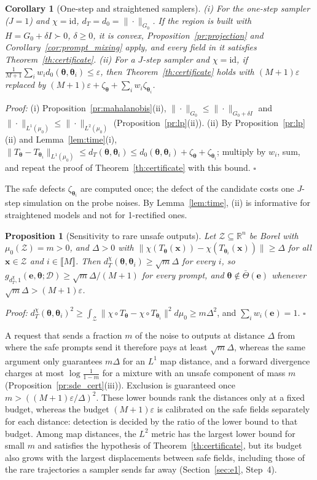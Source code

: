 \documentclass{article}
\newcommand{\RR}{\mathbb{R}}
\newcommand{\cD}{\mathcal{D}}
\newcommand{\bth}{\boldsymbol{\theta}}
\newcommand{\bx}{\mathbf{x}}
\newcommand{\be}{\mathbf{e}}
\newcommand{\Tbar}{\bar{\Theta}}
\theoremstyle{plain}
\newtheorem{proposition}[theorem]{Proposition}
\newtheorem{corollary}[theorem]{Corollary}
\theoremstyle{remark}
\begin{document}
\begin{corollary}[One-step and straightened samplers]\label{cor:one_step}
(i) For the one-step sampler ($J=1$) and $\chi=\mathrm{id}$, $d_T=d_0=\|\cdot\|_{G_0}$. If the region is built with
$H=G_0+\delta I\succ0$, $\delta\ge0$, it is convex, Proposition~\ref{pr:projection} and
Corollary~\ref{cor:prompt_mixing} apply, and every field in it satisfies Theorem~\ref{th:certificate}.
(ii) For a $J$-step sampler and $\chi=\mathrm{id}$, if $\frac{1}{M+1}\sum_iw_id_0(\bth,\bth_i)\le\varepsilon$, then
Theorem~\ref{th:certificate} holds with $(M+1)\varepsilon$ replaced by
$(M+1)\varepsilon+\zeta_{\bth}+\sum_iw_i\zeta_{\bth_i}$.
\end{corollary}
\textit{Proof:}
(i) Proposition~\ref{pr:mahalanobis}(ii), $\|\cdot\|_{G_0}\le\|\cdot\|_{G_0+\delta I}$ and
$\|\cdot\|_{L^1(\mu_0)}\le\|\cdot\|_{L^2(\mu_0)}$ (Proposition~\ref{pr:lp}(ii)). (ii) By Proposition~\ref{pr:lp}(ii) and Lemma~\ref{lem:time}(i),
$\|T_{\bth}-T_{\bth_i}\|_{L^1(\mu_0)}\le d_T(\bth,\bth_i)\le d_0(\bth,\bth_i)+\zeta_{\bth}+\zeta_{\bth_i}$; multiply by $w_i$, sum, and
repeat the proof of Theorem~\ref{th:certificate} with this bound. \hfill$\square$

The safe defects $\zeta_{\bth_i}$ are computed once; the defect of the candidate costs one $J$-step
simulation on the probe noises. By Lemma~\ref{lem:time}, (ii) is informative for straightened
models and not for 1-rectified ones.

\begin{proposition}[Sensitivity to rare unsafe outputs]\label{pr:sqrt_m}
Let $\mathcal Z\subseteq\RR^n$ be Borel with $\mu_0(\mathcal Z)=m>0$, and $\Delta>0$ with
$\|\chi(T_{\bth}(\bx))-\chi(T_{\bth_i}(\bx))\|\ge\Delta$ for all $\bx\in\mathcal Z$ and $i\in\llbracket M\rrbracket$. Then
$d^\chi_T(\bth,\bth_i)\ge\sqrt m\Delta$ for every $i$, so $g_{d^\chi_T,1}(\be,\bth;\cD)\ge\sqrt m\Delta/(M+1)$ for every
prompt, and $\bth\notin\Tbar(\be)$ whenever $\sqrt m\Delta>(M+1)\varepsilon$.
\end{proposition}
\textit{Proof:}
$d^\chi_T(\bth,\bth_i)^2\ge\int_{\mathcal Z}\|\chi\circ T_{\bth}-\chi\circ T_{\bth_i}\|^2d\mu_0\ge m\Delta^2$, and $\sum_iw_i(\be)=1$.
\hfill$\square$

A request that sends a fraction $m$ of the noise to outputs at distance $\Delta$ from where the safe
prompts send it therefore pays at least $\sqrt m\Delta$, whereas the same argument only guarantees $m\Delta$ for an $L^1$ map
distance, and a forward divergence charges at most $\log\frac{1}{1-m}$ for a mixture with an unsafe
component of mass $m$ (Proposition~\ref{pr:sde_cert}(iii)). Exclusion is guaranteed once
$m>((M+1)\varepsilon/\Delta)^2$. These lower bounds rank the distances only at a fixed budget, whereas the budget
$(M+1)\varepsilon$ is calibrated on the safe fields separately for each distance: detection is decided by the ratio of the
lower bound to that budget. Among map distances, the $L^2$ metric has the largest lower bound for small $m$ and satisfies the
hypothesis of Theorem~\ref{th:certificate}, but its budget also grows with the largest displacements between safe fields,
including those of the rare trajectories a sampler sends far away (Section~\ref{sec:e1}, Step~4).
\end{document}
